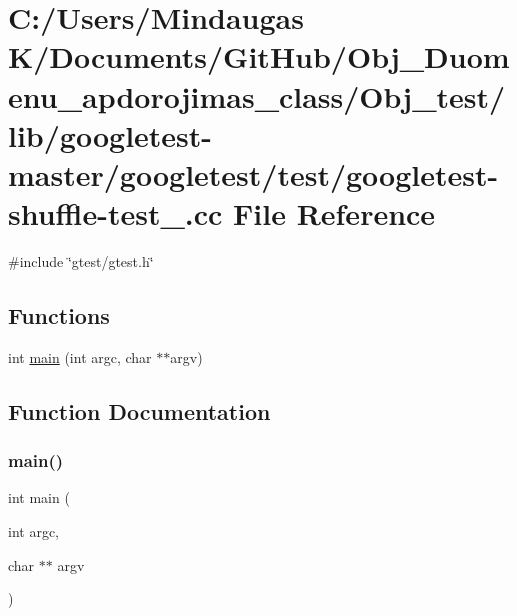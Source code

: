 \hypertarget{_obj__test_2lib_2googletest-master_2googletest_2test_2googletest-shuffle-test___8cc}{}\section{C\+:/\+Users/\+Mindaugas K/\+Documents/\+Git\+Hub/\+Obj\+\_\+\+Duomenu\+\_\+apdorojimas\+\_\+class/\+Obj\+\_\+test/lib/googletest-\/master/googletest/test/googletest-\/shuffle-\/test\+\_\+.cc File Reference}
\label{_obj__test_2lib_2googletest-master_2googletest_2test_2googletest-shuffle-test___8cc}
{\ttfamily \#include \char`\"{}gtest/gtest.\+h\char`\"{}}\newline
\subsection*{Functions}
\begin{DoxyCompactItemize}
\item 
int \mbox{\hyperlink{_obj__test_2lib_2googletest-master_2googletest_2test_2googletest-shuffle-test___8cc_a3c04138a5bfe5d72780bb7e82a18e627}{main}} (int argc, char $\ast$$\ast$argv)
\end{DoxyCompactItemize}


\subsection{Function Documentation}
\mbox{\label{_obj__test_2lib_2googletest-master_2googletest_2test_2googletest-shuffle-test___8cc_a3c04138a5bfe5d72780bb7e82a18e627}} 
\subsubsection{\texorpdfstring{main()}{main()}}
{\footnotesize\ttfamily int main (\begin{DoxyParamCaption}\item[{int}]{argc,  }\item[{char $\ast$$\ast$}]{argv }\end{DoxyParamCaption})}

